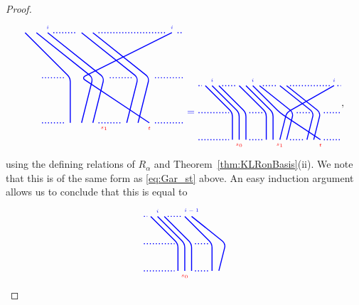\documentclass[twoside,11pt,reqno,letter]{amsart}
\numberwithin{equation}{section}
\theoremstyle{definition}  %
\newcommand{\0}{{\bar 0}}
\newcommand{\1}{{\bar 1}}
\newcommand{\al}{\alpha}
\newenvironment{braid}{%
  \begin{tikzpicture}[baseline=6mm,blue,line width=1pt, scale=0.4,
                      draw/.append style={rounded corners},
                      every node/.append style={font=\tiny}]%
  }{\end{tikzpicture}
}
\begin{document}
{\begin{proof}
\[\begin{braid}
    \draw[dotted](7.5,4)--(9.5,4);
    \draw[dotted](7.5,0)--(9.5,0);
    \draw(6,8)--(10,4)--(10,0);
    \draw[dotted](12.5,8)--(18.5,8);
    \draw(19,8)node[above]{$i$}--(11,4)--(17,0)node[below,color=red]{$t$};
    \draw(7,8)--(12,4)--(11,0);
    \draw(8,8)node[above]{$i$}--(13,4)--(12,0);
    \draw(13,0)node[below,color=red]{$s_1$};
    \draw[dotted](8.5,8)--(10.5,8);
    \draw[dotted](13.5,4)--(15.5,4);
    \draw[dotted](12.5,0)--(14.5,0);
    \draw(11,8)--(16,4)--(15,0);
    \draw(12,8)--(17,4)--(16,0);
    \draw[dotted](19.5,8)--(20,8);
    \draw[dotted](17.5,4)--(20,4);
    \draw[dotted](17.5,0)--(20,0);
  \end{braid}
  \begin{braid}\tikzset{scale=0.6,baseline=12mm}
    \draw(0,4)node[font=\normalsize]{$=$};
  \end{braid}
  \begin{braid}\tikzset{scale=0.6,baseline=12mm}
    \draw[dotted](0,8)--(0.5,8);
    \draw[dotted](0,4)--(4.5,4);
    \draw[dotted](0,0)--(4.5,0);
    \draw(1,8)--(5,4)--(5,0);
    \draw(2,8)node[above]{$i$}--(6,4)--(6,0)node[below,color=red]{$s_0$};
    \draw(3,8)--(7,4)--(7,0);
    \draw[dotted](3.5,8)--(5.5,8);
    \draw[dotted](7.5,4)--(9.5,4);
    \draw[dotted](7.5,0)--(9.5,0);
    \draw(6,8)--(10,4)--(10,0);
    \draw(7,8)--(11,4)--(11,0);
    \draw(8,8)node[above]{$i$}--(12,4)--(18,0)node[below,color=red]{$t$};
    \draw[dotted](13.5,8)--(19.5,8);
    \draw(20,8)node[above]{$i$}--(13,4)--(12,0)node[below,color=red]{$s_1$};
    \draw(9,8)--(14,4)--(13,0);
    \draw[dotted](9.5,8)--(11.5,8);
    \draw[dotted](14.5,4)--(16.5,4);
    \draw[dotted](13.5,0)--(15.5,0);
    \draw(12,8)--(17,4)--(16,0);
    \draw(13,8)--(18,4)--(17,0);
    \draw[dotted](20.5,8)--(21,8);
    \draw[dotted](18.5,4)--(21,4);
    \draw[dotted](18.5,0)--(21,0);
  \end{braid},
\]
  using the defining relations of $R_\al$ and Theorem~\ref{thm:KLRonBasis}(ii). We note that this is of the same form as \eqref{eq:Gar_st} above. An easy induction argument allows us to conclude that this is equal to
\[
  \begin{braid}\tikzset{scale=0.6,baseline=12mm}
    \draw[dotted](0,8)--(0.5,8);
    \draw[dotted](0,4)--(4.5,4);
    \draw[dotted](0,0)--(4.5,0);
    \draw(1,8)--(5,4)--(5,0);
    \draw(2,8)node[above]{$i$}--(6,4)--(6,0)node[below,color=red]{$s_0$};
    \draw(3,8)--(7,4)--(7,0);
    \draw[dotted](3.5,8)--(5.5,8);
    \draw[dotted](7.5,4)--(9.5,4);
    \draw[dotted](7.5,0)--(9.5,0);
    \draw(6,8)--(10,4)--(10,0);
    \draw(7,8)node[above]{$i-1$}--(12,4)--(11,0);

\end{braid}\]
\end{proof}}
\end{document}
